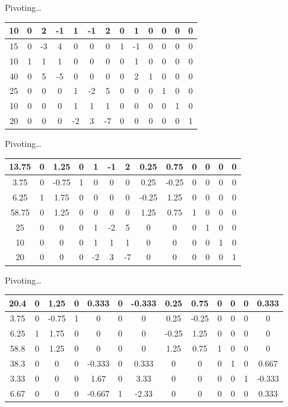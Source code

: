 \documentclass[a4paper,12pt]{article}
\begin{document}
Pivoting\dots
\begin{center}
\begin{tabular}{| c | c  c  c  c  c  c  c  c  c  c  c  c |}
\hline
10 & 0 & 2 & -1 & 1 & -1 & 2 & 0 & 1 & 0 & 0 & 0 & 0\\
\hline
15 & 0 & -3 & 4 & 0 & 0 & 0 & 1 & -1 & 0 & 0 & 0 & 0\\
10 & 1 & 1 & 1 & 0 & 0 & 0 & 0 & 1 & 0 & 0 & 0 & 0\\
40 & 0 & 5 & -5 & 0 & 0 & 0 & 0 & 2 & 1 & 0 & 0 & 0\\
25 & 0 & 0 & 0 & 1 & -2 & 5 & 0 & 0 & 0 & 1 & 0 & 0\\
10 & 0 & 0 & 0 & 1 & 1 & 1 & 0 & 0 & 0 & 0 & 1 & 0\\
20 & 0 & 0 & 0 & -2 & 3 & -7 & 0 & 0 & 0 & 0 & 0 & 1\\
\hline
\end{tabular}
\end{center}

Pivoting\dots
\begin{center}
\begin{tabular}{| c | c  c  c  c  c  c  c  c  c  c  c  c |}
\hline
13.75 & 0 & 1.25 & 0 & 1 & -1 & 2 & 0.25 & 0.75 & 0 & 0 & 0 & 0\\
\hline
3.75 & 0 & -0.75 & 1 & 0 & 0 & 0 & 0.25 & -0.25 & 0 & 0 & 0 & 0\\
6.25 & 1 & 1.75 & 0 & 0 & 0 & 0 & -0.25 & 1.25 & 0 & 0 & 0 & 0\\
58.75 & 0 & 1.25 & 0 & 0 & 0 & 0 & 1.25 & 0.75 & 1 & 0 & 0 & 0\\
25 & 0 & 0 & 0 & 1 & -2 & 5 & 0 & 0 & 0 & 1 & 0 & 0\\
10 & 0 & 0 & 0 & 1 & 1 & 1 & 0 & 0 & 0 & 0 & 1 & 0\\
20 & 0 & 0 & 0 & -2 & 3 & -7 & 0 & 0 & 0 & 0 & 0 & 1\\
\hline
\end{tabular}
\end{center}

Pivoting\dots
\begin{center}
\begin{tabular}{| c | c  c  c  c  c  c  c  c  c  c  c  c |}
\hline
20.4 & 0 & 1.25 & 0 & 0.333 & 0 & -0.333 & 0.25 & 0.75 & 0 & 0 & 0 & 0.333\\
\hline
3.75 & 0 & -0.75 & 1 & 0 & 0 & 0 & 0.25 & -0.25 & 0 & 0 & 0 & 0\\
6.25 & 1 & 1.75 & 0 & 0 & 0 & 0 & -0.25 & 1.25 & 0 & 0 & 0 & 0\\
58.8 & 0 & 1.25 & 0 & 0 & 0 & 0 & 1.25 & 0.75 & 1 & 0 & 0 & 0\\
38.3 & 0 & 0 & 0 & -0.333 & 0 & 0.333 & 0 & 0 & 0 & 1 & 0 & 0.667\\
3.33 & 0 & 0 & 0 & 1.67 & 0 & 3.33 & 0 & 0 & 0 & 0 & 1 & -0.333\\
6.67 & 0 & 0 & 0 & -0.667 & 1 & -2.33 & 0 & 0 & 0 & 0 & 0 & 0.333\\
\hline
\end{tabular}
\end{center}
\end{document}
